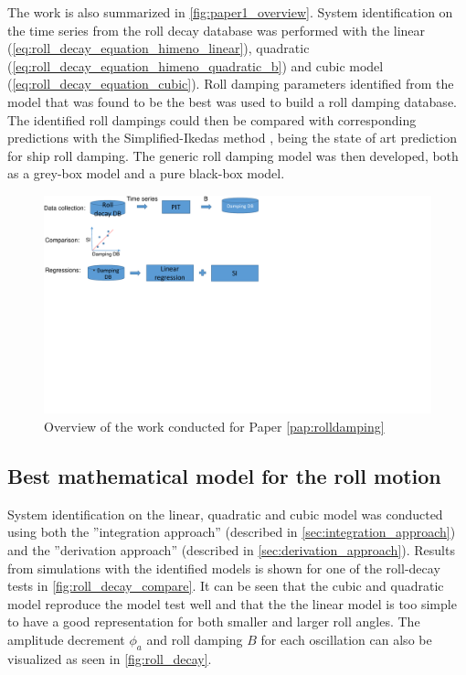\noindent The work is also summarized in \autoref{fig:paper1_overview}. System identification on the time series from the roll decay database was performed with the linear (\autoref{eq:roll_decay_equation_himeno_linear}), quadratic (\autoref{eq:roll_decay_equation_himeno_quadratic_b}) and cubic model (\autoref{eq:roll_decay_equation_cubic}). Roll damping parameters identified from the model that was found to be the best was used to build a roll damping database. The identified roll dampings could then be compared with corresponding predictions with the Simplified-Ikedas method \cite{kawahara_simple_2011}, being the state of art prediction for ship roll damping.
The generic roll damping model was then developed, both as a grey-box model and a pure black-box model.
\begin{figure}[!htb]
    \centering
    \includegraphics[width=\linewidth]{kappa/images/workflow.pdf}
    \caption{Overview of the work conducted for Paper \ref{pap:rolldamping}}
    \label{fig:paper1_overview}
\end{figure}

\subsection{Best mathematical model for the roll motion}
System identification on the linear, quadratic and cubic model was conducted using both the ''integration approach'' (described in \autoref{sec:integration_approach}) and the ''derivation approach'' (described in \autoref{sec:derivation_approach}).
Results from simulations with the identified models is shown for one of the roll-decay tests in \autoref{fig:roll_decay_compare}. It can be seen that the cubic and quadratic model reproduce the model test well and that the the linear model is too simple to have a good representation for both smaller and larger roll angles. The amplitude decrement $\phi_a$ and roll damping $B$ for each oscillation can also be visualized as seen in \autoref{fig:roll_decay}.

